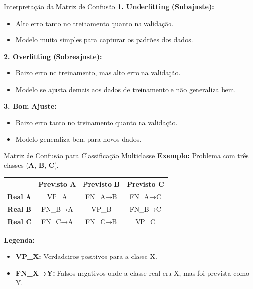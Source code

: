 \documentclass{beamer}
\begin{document}
\begin{frame}{Interpretação da Matriz de Confusão}
    \textbf{1. Underfitting (Subajuste):}
    \begin{itemize}
        \item Alto erro tanto no treinamento quanto na validação.
        \item Modelo muito simples para capturar os padrões dos dados.
    \end{itemize}

    \textbf{2. Overfitting (Sobreajuste):}
    \begin{itemize}
        \item Baixo erro no treinamento, mas alto erro na validação.
        \item Modelo se ajusta demais aos dados de treinamento e não generaliza bem.
    \end{itemize}

    \textbf{3. Bom Ajuste:}
    \begin{itemize}
        \item Baixo erro tanto no treinamento quanto na validação.
        \item Modelo generaliza bem para novos dados.
    \end{itemize}
\end{frame}

\begin{frame}{Matriz de Confusão para Classificação Multiclasse}
    \textbf{Exemplo:} Problema com três classes (\textbf{A}, \textbf{B}, \textbf{C}).

    \begin{table}[]
        \begin{tabular}{|c|c|c|c|}
            \hline
            & \textbf{Previsto A} & \textbf{Previsto B} & \textbf{Previsto C} \\ \hline
            \textbf{Real A} & VP\_A & FN\_A→B & FN\_A→C \\ \hline
            \textbf{Real B} & FN\_B→A & VP\_B & FN\_B→C \\ \hline
            \textbf{Real C} & FN\_C→A & FN\_C→B & VP\_C \\ \hline
        \end{tabular}
    \end{table}

    \textbf{Legenda:}
    \begin{itemize}
        \item \textbf{VP\_X:} Verdadeiros positivos para a classe X.
        \item \textbf{FN\_X→Y:} Falsos negativos onde a classe real era X, mas foi prevista como Y.
    \end{itemize}
\end{frame}
\end{document}
